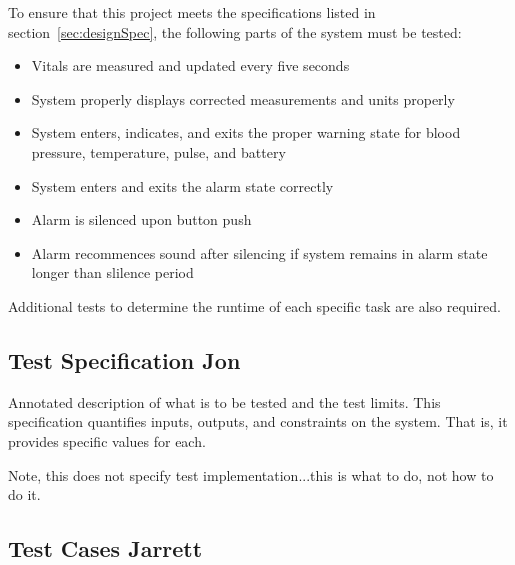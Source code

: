 \documentclass[12pt]{article} %
\begin{document}
To ensure that this project meets the specifications listed in 
section~\ref{sec:designSpec}, the following parts of the system must be 
tested: 

\begin{itemize}
	\item Vitals are measured and updated every five seconds
	\item System properly displays corrected measurements and units properly
	\item System enters, indicates, and exits the proper warning state for blood pressure, temperature, pulse, and battery
	\item System enters and exits the alarm state correctly
	\item Alarm is silenced upon button push
	\item Alarm recommences sound after silencing if system remains in alarm state longer than slilence period
\end{itemize}

Additional tests to determine the runtime of each specific task are also required.

\subsection{Test Specification Jon}

Annotated description of what is to be tested and the test limits.  This specification quantifies inputs, outputs, and constraints on the system.  That is, it provides specific values for each. 

Note, this does not specify test implementation...this is what to do, not how to do it.

\subsection{Test Cases  Jarrett}
\end{document}
